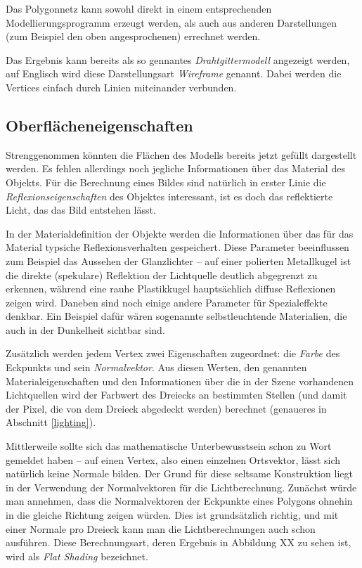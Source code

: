 Das Polygonnetz kann sowohl direkt in einem entsprechenden Modellierungsprogramm erzeugt werden, als auch aus anderen Darstellungen (zum Beispiel den oben angesprochenen) errechnet werden.

Das Ergebnis kann bereits als so gennantes \emph{Drahtgittermodell} angezeigt werden, auf Englisch wird diese Darstellungsart \emph{Wireframe} genannt. Dabei werden die Vertices einfach durch Linien miteinander verbunden.


\subsection{Oberflächeneigenschaften}
Strenggenommen könnten die Flächen des Modells bereits jetzt gefüllt dargestellt werden. Es fehlen allerdings noch jegliche Informationen über das Material des Objekts. Für die Berechnung eines Bildes sind natürlich in erster Linie die \emph{Reflexionseigenschaften} des Objektes interessant, ist es doch das reflektierte Licht, das das Bild entstehen lässt.

In der Materialdefinition der Objekte werden die Informationen über das für das Material typsiche Reflexionsverhalten gespeichert. Diese Parameter beeinflussen zum Beispiel das Aussehen der Glanzlichter -- auf einer polierten Metallkugel ist die direkte (spekulare) Reflektion der Lichtquelle deutlich abgegrenzt zu erkennen, während eine rauhe Plastikkugel hauptsächlich diffuse Reflexionen zeigen wird. Daneben sind noch einige andere Parameter für Spezialeffekte denkbar. Ein Beispiel dafür wären sogenannte selbstleuchtende Materialien, die auch in der Dunkelheit sichtbar sind.

Zusätzlich werden jedem Vertex zwei Eigenschaften zugeordnet: die \emph{Farbe} des Eckpunkts und sein \emph{Normalvektor}. Aus diesen Werten, den genannten Materialeigenschaften und den Informationen über die in der Szene vorhandenen Lichtquellen wird der Farbwert des Dreiecks an bestimmten Stellen (und damit der Pixel, die von dem Dreieck abgedeckt werden) berechnet (genaueres in Abschnitt \ref{lighting}).

Mittlerweile sollte sich das mathematische Unterbewusstsein schon zu Wort gemeldet haben -- auf einen Vertex, also einen einzelnen Ortsvektor, lässt sich natürlich keine Normale bilden. Der Grund für diese seltsame Konstruktion liegt in der Verwendung der Normalvektoren für die Lichtberechnung. Zunächst würde man annehmen, dass die Normalvektoren der Eckpunkte eines Polygons ohnehin in die gleiche Richtung zeigen würden. Dies ist grundsätzlich richtig, und mit einer Normale pro Dreieck kann man die Lichtberechnungen auch schon ausführen. Diese Berechnungsart, deren Ergebnis in Abbildung XX zu sehen ist, wird als \emph{Flat Shading} bezeichnet.

